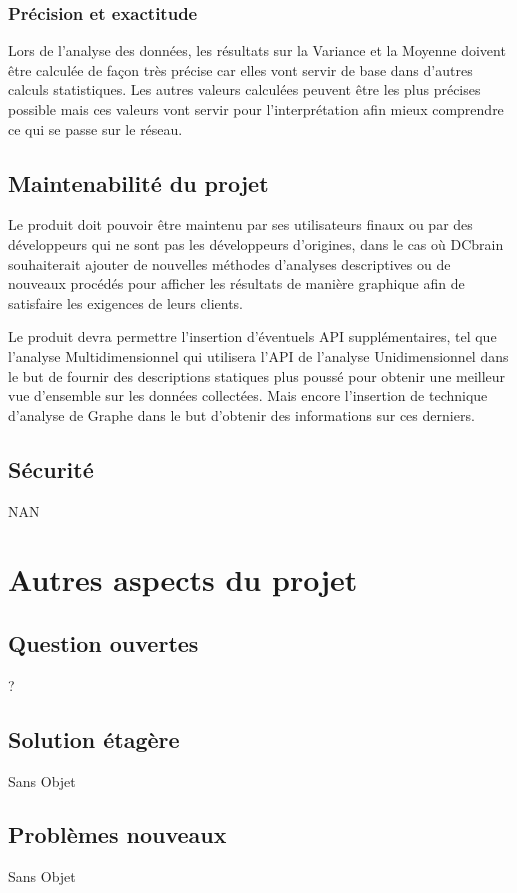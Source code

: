			\subsubsection{Précision et exactitude}
			Lors de l'analyse des données, les résultats sur la Variance et la Moyenne doivent être calculée de façon très précise car elles vont servir de base dans d’autres calculs statistiques. Les autres valeurs calculées peuvent être les plus précises possible mais ces valeurs vont servir pour l'interprétation afin mieux comprendre ce qui se passe sur le réseau.

		\subsection{Maintenabilité du projet}
		Le produit doit pouvoir être maintenu par ses utilisateurs finaux ou par des développeurs qui ne sont pas les développeurs d’origines, dans le cas où DCbrain souhaiterait ajouter de nouvelles méthodes d’analyses descriptives ou de nouveaux procédés pour afficher les résultats de manière graphique afin de satisfaire les exigences de leurs clients.\newline
		
		Le produit devra permettre l'insertion d'éventuels API supplémentaires, tel que l'analyse Multidimensionnel qui utilisera l'API de l'analyse Unidimensionnel dans le but de fournir des descriptions statiques plus poussé pour obtenir une meilleur vue d'ensemble sur les données collectées. Mais encore l'insertion de technique d'analyse de Graphe dans le but d'obtenir des informations sur ces derniers.
		
		\subsection{Sécurité} 
		NAN
		
	\section{Autres aspects du projet}
		\subsection{Question ouvertes}
			?
		\subsection{Solution étagère}
			Sans Objet
		\subsection{Problèmes nouveaux}
			Sans Objet
